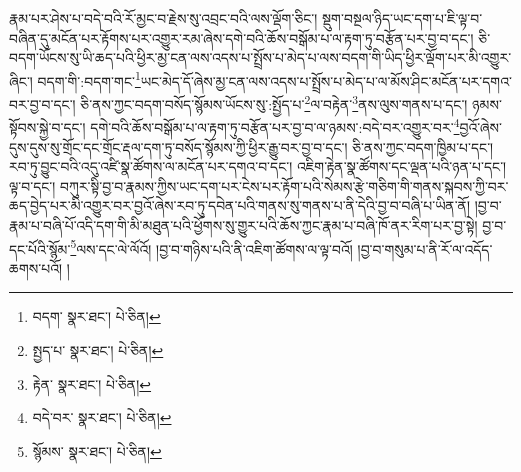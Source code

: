 རྣམ་པར་ཤེས་པ་བདེ་བའི་རོ་མྱང་བ་རྗེས་སུ་འབྲང་བའི་ལས་ལྡོག་ཅིང་། སྡུག་བསྔལ་ཉིད་ཡང་དག་པ་ཇི་ལྟ་བ་བཞིན་དུ་མངོན་པར་རྟོགས་པར་འགྱུར་རམ་ཞེས་དགེ་བའི་ཆོས་བསྒོམ་པ་ལ་རྟག་ཏུ་བརྩོན་པར་བྱ་བ་དང་། ཅི་བདག་ཡོངས་སུ་ཡི་ཆད་པའི་ཕྱིར་མྱ་ངན་ལས་འདས་པ་སྤྲོས་པ་མེད་པ་ལས་བདག་གི་ཡིད་ཕྱིར་ལྡོག་པར་མི་འགྱུར་ཞིང་། བདག་གི་:བདག་གང་\footnote{བདག་  སྣར་ཐང་།  པེ་ཅིན། }ཡང་མེད་དོ་ཞེས་མྱ་ངན་ལས་འདས་པ་སྤྲོས་པ་མེད་པ་ལ་མོས་ཤིང་མངོན་པར་དགའ་བར་བྱ་བ་དང་། ཅི་ནས་ཀྱང་བདག་བསོད་སྙོམས་ཡོངས་སུ་:སྤྱོད་པ་\footnote{སྤྱད་པ་  སྣར་ཐང་།  པེ་ཅིན། }ལ་བརྟེན་\footnote{རྟེན་  སྣར་ཐང་།  པེ་ཅིན། }ནས་ལུས་གནས་པ་དང་། ཉམས་སྟོབས་སྐྱེ་བ་དང་། དགེ་བའི་ཆོས་བསྒོམ་པ་ལ་རྟག་ཏུ་བརྩོན་པར་བྱ་བ་ལ་ཉམས་:བདེ་བར་འགྱུར་བར་\footnote{བདེ་བར་  སྣར་ཐང་།  པེ་ཅིན། }བྱའོ་ཞེས་དུས་དུས་སུ་གྲོང་དང་གྲོང་རྡལ་དག་ཏུ་བསོད་སྙོམས་ཀྱི་ཕྱིར་རྒྱུ་བར་བྱ་བ་དང་། ཅི་ནས་ཀྱང་བདག་ཁྱིམ་པ་དང་། རབ་ཏུ་བྱུང་བའི་འདུ་འཛི་སྣ་ཚོགས་ལ་མངོན་པར་དགའ་བ་དང་། འཇིག་རྟེན་སྣ་ཚོགས་དང་ལྡན་པའི་ཉན་པ་དང་། ལྟ་བ་དང་། བཀུར་སྟི་བྱ་བ་རྣམས་ཀྱིས་ཡང་དག་པར་ངེས་པར་རྟོག་པའི་སེམས་རྩེ་གཅིག་གི་གནས་སྐབས་ཀྱི་བར་ཆད་བྱེད་པར་མི་འགྱུར་བར་བྱའོ་ཞེས་རབ་ཏུ་དབེན་པའི་གནས་སུ་གནས་པ་ནི་དེའི་བྱ་བ་བཞི་པ་ཡིན་ནོ། །བྱ་བ་རྣམ་པ་བཞི་པོ་འདི་དག་གི་མི་མཐུན་པའི་ཕྱོགས་སུ་གྱུར་པའི་ཆོས་ཀྱང་རྣམ་པ་བཞི་ཁོ་ནར་རིག་པར་བྱ་སྟེ། བྱ་བ་དང་པོའི་སྙོམ་\footnote{སྙོམས་  སྣར་ཐང་།  པེ་ཅིན། }ལས་དང་ལེ་ལོའོ། །བྱ་བ་གཉིས་པའི་ནི་འཇིག་ཚོགས་ལ་ལྟ་བའོ། །བྱ་བ་གསུམ་པ་ནི་རོ་ལ་འདོད་ཆགས་པའོ། །
